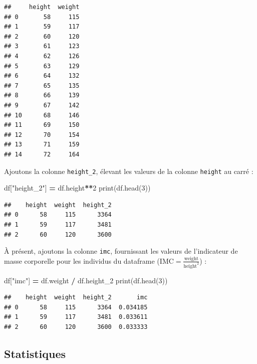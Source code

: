 \documentclass[12pt,]{book}
\newenvironment{Shaded}{\begin{snugshade}}{\end{snugshade}}
\newcommand{\DecValTok}[1]{\textcolor[rgb]{0.00,0.00,0.81}{#1}}
\newcommand{\StringTok}[1]{\textcolor[rgb]{0.31,0.60,0.02}{#1}}
\newcommand{\OperatorTok}[1]{\textcolor[rgb]{0.81,0.36,0.00}{\textbf{#1}}}
\newcommand{\BuiltInTok}[1]{#1}
\newcommand{\NormalTok}[1]{#1}
\numberwithin{equation}{section}
\numberwithin{countremarque}{section}
\begin{document}
\begin{lstlisting}
##     height  weight
## 0       58     115
## 1       59     117
## 2       60     120
## 3       61     123
## 4       62     126
## 5       63     129
## 6       64     132
## 7       65     135
## 8       66     139
## 9       67     142
## 10      68     146
## 11      69     150
## 12      70     154
## 13      71     159
## 14      72     164
\end{lstlisting}

Ajoutons la colonne \texttt{height\_2}, élevant les valeurs de la
colonne \texttt{height} au carré :

\begin{Shaded}
\begin{Highlighting}[]
\NormalTok{df[}\StringTok{"height_2"}\NormalTok{] }\OperatorTok{=}\NormalTok{ df.height}\OperatorTok{**}\DecValTok{2}
\BuiltInTok{print}\NormalTok{(df.head(}\DecValTok{3}\NormalTok{))}
\end{Highlighting}
\end{Shaded}

\begin{lstlisting}
##    height  weight  height_2
## 0      58     115      3364
## 1      59     117      3481
## 2      60     120      3600
\end{lstlisting}

À présent, ajoutons la colonne \texttt{imc}, fournissant les valeurs de
l'indicateur de masse corporelle pour les individus du dataframe
(\(\text{IMC} = \frac{\text{weight}}{\text{height}^2}\)) :

\begin{Shaded}
\begin{Highlighting}[]
\NormalTok{df[}\StringTok{"imc"}\NormalTok{] }\OperatorTok{=}\NormalTok{ df.weight }\OperatorTok{/}\NormalTok{ df.height_2}
\BuiltInTok{print}\NormalTok{(df.head(}\DecValTok{3}\NormalTok{))}
\end{Highlighting}
\end{Shaded}

\begin{lstlisting}
##    height  weight  height_2       imc
## 0      58     115      3364  0.034185
## 1      59     117      3481  0.033611
## 2      60     120      3600  0.033333
\end{lstlisting}

\subsection{Statistiques}\label{pandas-statistiques-df}
\end{document}
